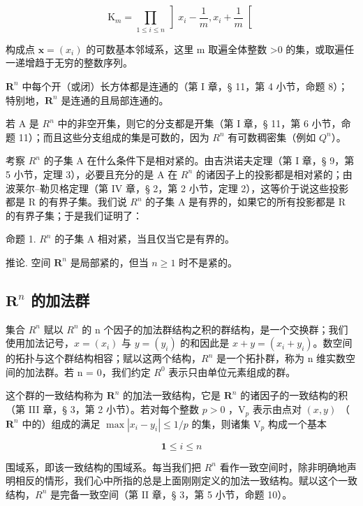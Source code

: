 \[
\mathrm{K} _ {m} = \prod_ {1 \leqslant i \leqslant n} \left] x _ {i} - \frac {1}{m}, x _ {i} + \frac {1}{m} \right[
\]

构成点 \(\boldsymbol{x} = (x_{i})\) 的可数基本邻域系，这里 m 取遍全体整数 \textgreater0 的集，或取遍任一递增趋于无穷的整数序列。

\(\mathbf{R}^n\) 中每个开（或闭）长方体都是连通的（第 I 章，§ 11，第 4 小节，命题 8）；特别地，\(\mathbf{R}^n\) 是连通的且局部连通的。

若 A 是 \(R^{n}\) 中的非空开集，则它的分支都是开集（第 I 章，§ 11，第 6 小节，命题 11）；而且这些分支组成的集是可数的，因为 \(R^{n}\) 有可数稠密集（例如 \(Q^{n}\)）。

考察 \(R^{n}\) 的子集 A 在什么条件下是相对紧的。由吉洪诺夫定理（第 I 章，§ 9，第 5 小节，定理 3），必要且充分的是 A 在 \(R^{n}\) 的诸因子上的投影都是相对紧的；由波莱尔–勒贝格定理（第 IV 章，§ 2，第 2 小节，定理 2），这等价于说这些投影都是 R 的有界子集。我们说 \(R^{n}\) 的子集 A 是有界的，如果它的所有投影都是 R 的有界子集；于是我们证明了：

命题 1. \(R^{n}\) 的子集 A 相对紧，当且仅当它是有界的。

推论. 空间 \(\mathbf{R}^n\) 是局部紧的，但当 \(n \geqslant 1\) 时不是紧的。

\subsection{\texorpdfstring{\(\mathbf{R}^n\) 的加法群}{R 的 n 次幂的加法群}}

集合 \(R^{n}\) 赋以 \(R^{n}\) 的 n 个因子的加法群结构之积的群结构，是一个交换群；我们使用加法记号，\(x = (x_{i})\) 与 \(y = (y_{i})\) 的和因此是 \(x + y = (x_{i} + y_{i})\)。数空间的拓扑与这个群结构相容；赋以这两个结构，\(R^{n}\) 是一个拓扑群，称为 n 维实数空间的加法群。若 n = 0，我们约定 \(R^{0}\) 表示只由单位元素组成的群。

这个群的一致结构称为 \(\mathbf{R}^n\) 的加法一致结构，它是 \(\mathbf{R}^n\) 的诸因子的一致结构的积（第 III 章，§ 3，第 2 小节）。若对每个整数 \(p > 0\) ，\(\mathrm{V}_p\) 表示由点对 \((x, y)\) （\(\mathbf{R}^n\) 中的）组成的满足 \(\max |x_i - y_i| \leqslant 1/p\) 的集，则诸集 \(\mathrm{V}_p\) 构成一个基本

\[
\mathbf {1} \leqslant i \leqslant n
\]

围域系，即该一致结构的围域系。每当我们把 \(R^{n}\) 看作一致空间时，除非明确地声明相反的情形，我们心中所指的总是上面刚刚定义的加法一致结构。赋以这个一致结构，\(R^{n}\) 是完备一致空间（第 II 章，§ 3，第 5 小节，命题 10）。

